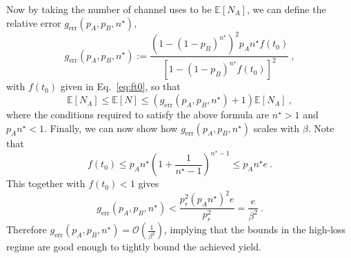 \documentclass[aps,pra,reprint,superscriptaddress]{revtex4-1}
\newcommand{\nstar}{n^{\star}}
\begin{document}
Now by taking the number of channel uses to be $\mathbb{E}\left[N_A\right]$, we can define the relative error $g_\text{err}(p_A, p_B, \nstar)$,
\begin{equation}
g_\text{err}(p_A, p_B, \nstar) := \frac{(1 - (1-p_B)^{\nstar})^2 p_A \nstar f(t_0)}{\left[1-(1-p_B)^{\nstar} f(t_0)\right]^2}\ ,
\label{eq:gerr1}
\end{equation}
with $f(t_0)$ given in Eq.~\eqref{eq:ft0}, so that
\begin{equation}
\mathbb{E}[N_A]  \leq \mathbb{E}\left[N\right] \leq  \left(g_\text{err}(p_A, p_B, \nstar) +1\right) \mathbb{E}[N_A]\ ,
\end{equation}
where the conditions required to satisfy the above formula are $\nstar>1$ and $p_A\nstar<1$. Finally, we can now show how $g_\text{err}(p_A, p_B, \nstar)$ scales with $\beta$. Note that
\begin{equation}
f(t_0) \leq p_A \nstar \left(1 + \frac{1}{\nstar - 1}\right)^{\nstar - 1} \leq  p_A \nstar e\ .
\end{equation}
This together with $f(t_0) <1$ gives
\begin{equation}
g_\text{err}(p_A, p_B, \nstar) < \frac{p_r^2 (p_A \nstar)^2 e}{p_r^2} = \frac{e}{\beta^2}\ .
\end{equation}
Therefore $g_\text{err}(p_A, p_B, \nstar) =
\mathcal{O}\left(\frac{1}{\beta^2}\right)$, implying that the bounds in the high-loss regime are good enough to tightly bound the achieved yield.
\end{document}
